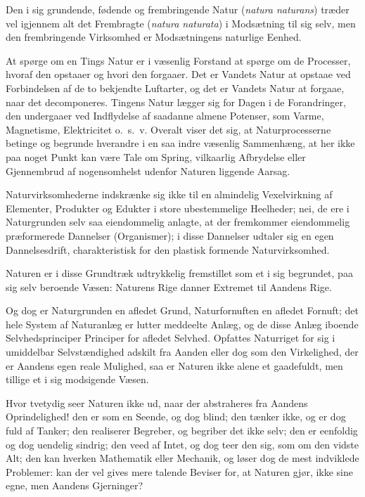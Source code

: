 \documentclass[12pt]{book}
\newcommand{\opage}[1]{\marginnote{\footnotesize\textit{[#1]}}}
\begin{document}
Den i sig grundende, fødende og frembringende Natur (\textit{natura
naturans}) træder vel igjennem alt det Frembragte (\textit{natura
naturata}) i Modsætning til sig selv, men den frembringende
Virksomhed er Modsætningens naturlige Eenhed.

At spørge om en Tings Natur er i væsenlig Forstand at spørge om de
Processer, hvoraf den opstaaer og hvori den forgaaer. Det er Vandets
Natur at opstaae ved Forbindelsen af de to bekjendte Luftarter, og
det er Vandets Natur at forgaae, naar det decomponeres. Tingens
Natur lægger sig for Dagen i de Forandringer, den undergaaer ved
Indflydelse af saadanne almene Potenser, som Varme, Magnetisme,
Elektricitet o.~s.~v. Overalt viser det sig, at Naturprocesserne
betinge og begrunde hverandre i en
\opage{84} saa indre væsenlig Sammenhæng, at her ikke paa noget Punkt kan være
Tale om Spring, vilkaarlig Afbrydelse eller Gjennembrud af
nogensomhelst udenfor Naturen liggende Aarsag.

Naturvirksomhederne indskrænke sig ikke til en almindelig
Vexelvirkning af Elementer, Produkter og Edukter i store
ubestemmelige Heelheder; nei, de ere i Naturgrunden selv saa
eiendommelig anlagte, at der fremkommer eiendommelig præformerede
Dannelser (Organismer); i disse Dannelser udtaler sig en egen
Dannelsesdrift, charakteristisk for den plastisk formende
Naturvirksomhed.

Naturen er i disse Grundtræk udtrykkelig fremstillet som et i sig
begrundet, paa sig selv beroende Væsen: Naturens Rige danner
Extremet til Aandens Rige.

Og dog er Naturgrunden en afledet Grund, Naturfornuften en afledet
Fornuft; det hele System af Naturanlæg er lutter meddeelte Anlæg, og
de disse Anlæg iboende Selvhedsprinciper Principer for afledet
Selvhed. Opfattes Naturriget for sig i umiddelbar Selvstændighed
adskilt fra Aanden eller dog som den Virkelighed, der er Aandens
egen reale Mulighed, saa er Naturen ikke alene et gaadefuldt, men
tillige et i sig modsigende Væsen.

Hvor tvetydig seer Naturen ikke ud, naar der abstraheres fra Aandens
Oprindelighed! den er som en Seende, og dog blind; den tænker ikke,
og er dog fuld af Tanker; den realiserer Begreber, og begriber det
ikke selv; den er eenfoldig og dog uendelig sindrig; den veed af
Intet, og dog teer den sig, som om den vidste Alt; den kan hverken
Mathematik eller Mechanik, og løser dog de mest indviklede
Problemer: kan der vel gives mere talende Beviser for, at Naturen
gjør, ikke sine egne, men Aandens Gjerninger?
\end{document}
